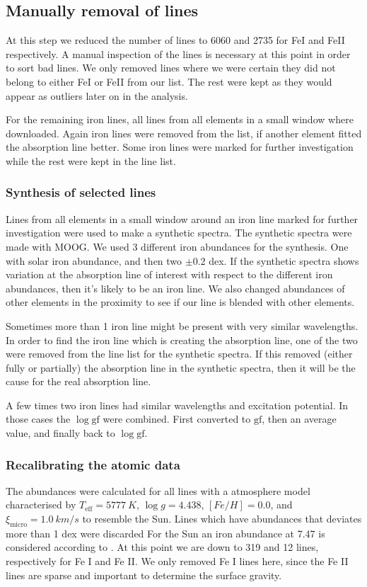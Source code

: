 \documentclass{aa}
\begin{document}
\subsection{Manually removal of lines}
\label{sub:manually_removal_of_lines}
At this step we reduced the number of lines to 6060 and 2735 for FeI and FeII
respectively. A manual inspection of the lines is necessary at this point in
order to sort bad lines.  We only removed lines where we were certain they did
not belong to either FeI or FeII from our list. The rest were kept as they
would appear as outliers later on in the analysis.

For the remaining iron lines, all lines from all elements in a small window
where downloaded. Again iron lines were removed from the list, if another
element fitted the absorption line better. Some iron lines were marked for
further investigation while the rest were kept in the line list.



\subsubsection{Synthesis of selected lines}
\label{sub:synthesis_of_selected_lines}
Lines from all elements in a small window around an iron line marked
for further investigation were used to make a synthetic spectra.
The synthetic spectra were made with MOOG. We used 3 different iron
abundances for the synthesis. One with solar iron abundance, and
then two $\pm0.2$ dex. If the synthetic spectra shows variation at
the absorption line of interest with respect to the different iron
abundances, then it's likely to be an iron line. We also changed
abundances of other elements in the proximity to see if our line is
blended with other elements.

Sometimes more than 1 iron line might be present with very similar
wavelengths. In order to find the iron line which is creating the
absorption line, one of the two were removed from the line list for
the synthetic spectra. If this removed (either fully or partially) the
absorption line in the synthetic spectra, then it will be the cause for
the real absorption line.

A few times two iron lines had similar wavelengths and excitation
potential. In those cases the $\log \mathrm{gf}$ were combined. First
converted to $\mathrm{gf}$, then an average value, and finally back to
$\log \mathrm{gf}$.


\subsubsection{Recalibrating the atomic data}
\label{ssub:Recalibrating-the-atomic-data}
The abundances were calculated for all lines with a atmosphere model
characterised by $T_\mathrm{eff}=\SI{5777}{K}$, $\log g = 4.438$,
$[Fe/H] = 0.0$, and $\xi_\mathrm{micro} = \SI{1.0}{km/s}$ to resemble
the Sun. Lines which have abundances that deviates more than 1 dex were
discarded For the Sun an iron abundance at 7.47 is considered according
to \citet{Gonzales2000}. At this point we are down to 319 and 12 lines,
respectively for Fe I and Fe II. We only removed Fe I lines here, since
the Fe II lines are sparse and important to determine the surface
gravity.
\end{document}

